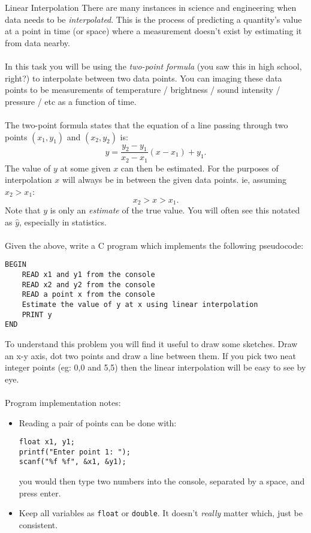 \documentclass{lab}
\begin{document}
\begin{task}{Linear Interpolation}{}
There are many instances in science and engineering when data needs to be \textit{interpolated}. This is the process of predicting a quantity's value at a point in time (or space) where a measurement doesn't exist by estimating it from data nearby.
\\ \\
In this task you will be using the \textit{two-point formula} (you saw this in high school, right?) to interpolate between two data points. You can imaging these data points to be measurements of temperature / brightness / sound intensity / pressure / etc as a function of time.\\ \\
The two-point formula states that the equation of a line passing through two points $(x_1, y_1)$ and $(x_2, y_2)$ is:
\begin{equation}
y = \frac{y_2 - y_1}{x_2 - x_1}(x - x_1) + y_1.
\end{equation}
The value of $y$ at some given $x$ can then be estimated. For the purposes of interpolation $x$ will always be in between the given data points. ie, assuming $x_2 > x_1$:
\begin{equation}
x_2 > x > x_1.
\end{equation}
Note that $y$ is only an \textit{estimate} of the true value. You will often see this notated as $\hat{y}$, especially in statistics.
\\ \\
Given the above, write a C program which implements the following pseudocode:
\begin{lstlisting}[style=CStyle]
BEGIN
	READ x1 and y1 from the console
	READ x2 and y2 from the console
	READ a point x from the console
	Estimate the value of y at x using linear interpolation
	PRINT y
END
\end{lstlisting}
To understand this problem you will find it useful to draw some sketches. Draw an x-y axis, dot two points and draw a line between them. If you pick two neat integer points (eg: 0,0 and 5,5) then the linear interpolation will be easy to see by eye.
\\ \\
Program implementation notes:
\begin{itemize}[itemsep=1mm]
\item Reading a pair of points can be done with:
\begin{lstlisting}[style=CStyle]
float x1, y1;
printf("Enter point 1: ");
scanf("%f %f", &x1, &y1);
\end{lstlisting}
you would then type two numbers into the console, separated by a space, and press enter.
\item Keep all variables as \texttt{float} or \texttt{double}. It doesn't \textit{really} matter which, just be consistent.
\end{itemize}
\end{task}
\end{document}
